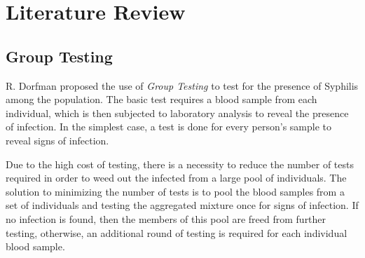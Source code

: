 \documentclass{sig-alternate}
\begin{document}
\section{Literature Review}

\subsection{Group Testing}

R. Dorfman proposed the use of \emph{Group Testing} to test for the presence of Syphilis \cite{Dorfman1943} among the population. The basic test requires a blood sample from each individual, which is then subjected to laboratory analysis to reveal the presence of infection. In the simplest case, a test is done for every person's sample to reveal signs of infection. 

Due to the high cost of testing, there is a necessity to reduce the number of tests required in order to weed out the infected from a large pool of individuals. The solution to minimizing the number of tests is to pool the blood samples from a set of individuals and testing the aggregated mixture once for signs of infection. If no infection is found, then the members of this pool are freed from further testing, otherwise, an additional round of testing is required for each individual blood sample.
\end{document}
